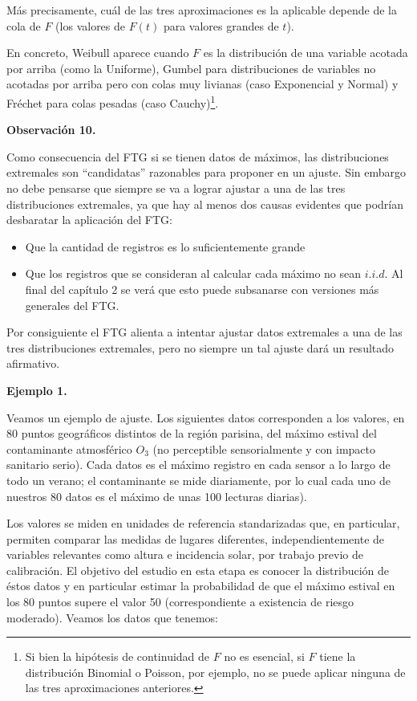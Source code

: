 \documentclass[
  oneside]{book}
\begin{document}
Más precisamente, cuál de las tres aproximaciones es la aplicable
depende de la cola de \(F\) (los valores de \(F(t)\) para valores
grandes de \(t\)).

En concreto, Weibull aparece cuando \(F\) es la distribución de una
variable acotada por arriba (como la Uniforme), Gumbel para
distribuciones de variables no acotadas por arriba pero con colas muy
livianas (caso Exponencial y Normal) y Fréchet para colas pesadas (caso
Cauchy)\footnote{Si bien  la hipótesis de continuidad de $F$ no es esencial, si $F$ tiene
la distribución Binomial o Poisson, por ejemplo, no se puede aplicar ninguna de las tres aproximaciones anteriores.}.

\textbf{Observación 10.}

Como consecuencia del FTG si se tienen datos de máximos, las
distribuciones extremales son ``candidatas'' razonables para proponer en
un ajuste. Sin embargo no debe pensarse que siempre se va a lograr
ajustar a una de las tres distribuciones extremales, ya que hay al menos
dos causas evidentes que podrían desbaratar la aplicación del FTG:

\begin{itemize}
\item Que la cantidad de registros es lo suficientemente grande
\item Que los registros que se consideran al calcular cada máximo no sean $i.i.d$. Al final del capítulo 2 se verá que esto puede subsanarse con versiones más generales del FTG.
\end{itemize}

Por consiguiente el FTG alienta a intentar ajustar datos extremales a
una de las tres distribuciones extremales, pero no siempre un tal ajuste
dará un resultado afirmativo.

\textbf{Ejemplo 1.}

Veamos un ejemplo de ajuste. Los siguientes datos corresponden a los
valores, en 80 puntos geográficos distintos de la región parisina, del
máximo estival del contaminante atmosférico \(O_3\) (no perceptible
sensorialmente y con impacto sanitario serio). Cada datos es el máximo
registro en cada sensor a lo largo de todo un verano; el contaminante se
mide diariamente, por lo cual cada uno de nuestros 80 datos es el máximo
de unas 100 lecturas diarias).

Los valores se miden en unidades de referencia standarizadas que, en
particular, permiten comparar las medidas de lugares diferentes,
independientemente de variables relevantes como altura e incidencia
solar, por trabajo previo de calibración. El objetivo del estudio en
esta etapa es conocer la distribución de éstos datos y en particular
estimar la probabilidad de que el máximo estival en los 80 puntos supere
el valor 50 (correspondiente a existencia de riesgo moderado). Veamos
los datos que tenemos:
\end{document}
